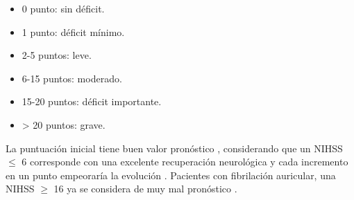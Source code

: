 \begin{itemize}
	\item 0 punto: sin déficit.
	\item 1 punto: déficit mínimo.
	\item 2-5 puntos: leve.
	\item 6-15 puntos: moderado.
	\item 15-20 puntos: déficit importante.
	\item > 20 puntos: grave.\\
\end{itemize}

\par La puntuación inicial tiene buen valor pronóstico \cite{heinemann1997measurement}, considerando que un NIHSS 	$\leq$ 6 corresponde con una excelente recuperación neurológica y cada incremento en un punto empeoraría la evolución \cite{Adams1993}. Pacientes con fibrilación auricular, una NIHSS $\geq$ 16 ya se considera de muy mal pronóstico \cite{frankel2000predicting}.\\